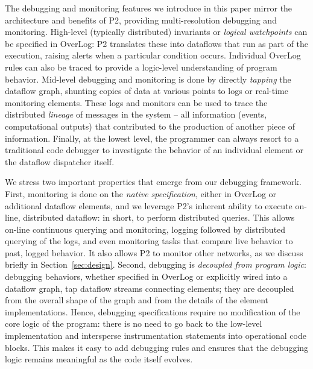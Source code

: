 \documentclass[10pt,twocolumn]{article}
\def\Sys{P2\xspace}
\def\Lang{OverLog\xspace}
\begin{document}
The debugging and monitoring features we introduce in this paper mirror the
architecture and benefits of \Sys, providing multi-resolution
debugging and monitoring.  High-level  (typically distributed)
invariants or {\em logical watchpoints} can be specified in
\Lang: \Sys translates these into dataflows that run as part of the
execution, raising alerts when a particular condition occurs.
Individual \Lang rules can also be traced to provide a 
logic-level understanding of program behavior.  Mid-level debugging
and monitoring is done by
directly {\em tapping} the dataflow graph, shunting copies of data at
various points to logs or real-time monitoring
elements.  These logs and monitors can be used to trace the
distributed {\em lineage} of messages in the system -- all information
(events, computational outputs) that contributed to the production of
another piece of information.  Finally, at the lowest level, the
programmer can always resort to a traditional code debugger to
investigate the behavior of an individual element or the dataflow
dispatcher itself.  

We stress two important properties that emerge from our debugging
framework.  First, monitoring is done on the 
{\em native specification}, either in \Lang or additional
dataflow elements, and we leverage \Sys's inherent
ability to execute on-line, distributed dataflow: in short, to perform
distributed queries.  This allows on-line continuous querying and
monitoring, logging followed by distributed querying of the
logs, and even monitoring tasks that compare live behavior to
past, logged behavior.  It also allows \Sys  to monitor
other networks, as we discuss briefly in
Section~\ref{sec:design}.  Second, debugging is {\em decoupled from
  program logic}: debugging behaviors, whether specified in
\Lang or explicitly wired into a dataflow graph, tap 
dataflow streams connecting elements; they are decoupled from the
overall shape of the graph and from the details of the element implementations.
Hence, debugging specifications require no 
modification of the core logic of the program: there is no need to go
back to the low-level implementation and intersperse instrumentation
statements into operational code blocks.  This makes it
easy to add debugging rules and ensures that the debugging
logic remains meaningful as the code itself evolves.

\end{document}
